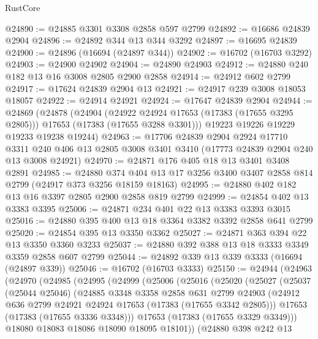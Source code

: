 \begin{lexlean}{RustCore}
\begin{coremodule}
@24890 := @24885 @3301 @3308 @2858 @597 @2799
@24892 := @16686 @24839 @2904
@24896 := @24892 @344 @13 @344 @3292
@24897 := @16695 @24839
@24900 := @24896 (@16694 (@24897 @344))
@24902 := @16702 (@16703 @3292)
@24903 := @24900 @24902
@24904 := @24890 @24903
@24912 := @24880 @240 @182 @13 @16 @3008 @2805 @2900 @2858
@24914 := @24912 @602 @2799
@24917 := @17624 @24839 @2904 @13
@24921 := @24917 @239 @3008 @18053 @18057
@24922 := @24914 @24921
@24924 := @17647 @24839 @2904
@24944 := @24869
    (@24878
      (@24904
        (@24922 @24924 @17653 (@17383 (@17655 @3295 @2805)))
        @17653
        (@17383 (@17655 @3288 @3301)))
      @19223
      @19226
      @19229
      @19233
      @19238
      @19244)
@24963 := @17706
    @24839
    @2904
    @2924
    @17710
    @3311
    @240
    @406
    @13
    @2805
    @3008
    @3401
    @3410
    (@17773 @24839 @2904 @240 @13 @3008 @24921)
@24970 := @24871 @176 @405 @18 @13 @3401 @3408 @2891
@24985 := @24880
    @374
    @404
    @13
    @17
    @3256
    @3400
    @3407
    @2858
    @814
    @2799
    (@24917 @373 @3256 @18159 @18163)
@24995 := @24880 @402 @182 @13 @16 @3397 @2805 @2900 @2858 @819 @2799
@24999 := @24854 @402 @13 @3383 @3395
@25006 := @24871 @234 @401 @22 @13 @3383 @3393 @3015
@25016 := @24880 @395 @400 @13 @18 @3364 @3382 @3392 @2858 @641 @2799
@25020 := @24854 @395 @13 @3350 @3362
@25027 := @24871 @363 @394 @22 @13 @3350 @3360 @3233
@25037 := @24880 @392 @388 @13 @18 @3333 @3349 @3359 @2858 @607 @2799
@25044 := @24892 @339 @13 @339 @3333 (@16694 (@24897 @339))
@25046 := @16702 (@16703 @3333)
@25150 := @24944
    (@24963
      (@24970
        (@24985
          (@24995
            (@24999
              (@25006
                (@25016
                  (@25020
                    (@25027
                      (@25037
                        (@25044 @25046)
                        (@24885
                          @3348
                          @3358
                          @2858
                          @631
                          @2799
                          @24903
                          (@24912 @636 @2799 @24921 @24924 @17653 (@17383 (@17655 @3342 @2805)))
                          @17653
                          (@17383 (@17655 @3336 @3348)))
                        @17653
                        (@17383 (@17655 @3329 @3349)))
                      @18080
                      @18083
                      @18086
                      @18090
                      @18095
                      @18101))
                  (@24880
                    @398
                    @242
                    @13

\end{coremodule}
\end{lexlean}
